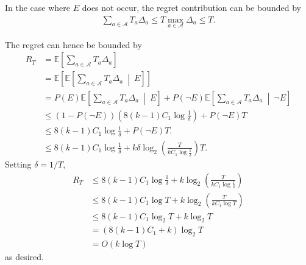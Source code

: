 In the case where $E$ does not occur, the regret contribution can be bounded by
\begin{equation}
    \begin{aligned}
        \sum_{a \in \mathcal{A}} T_a \Delta_a \leq T \max_{a\in \mathcal{A}} \Delta_a \leq T.
    \end{aligned}
\end{equation}

The regret can hence be bounded by
\begin{equation}
    \begin{aligned}
        R_T
         & =
        \mathbb{E}\left[ \sum_{a \in \mathcal{A}} T_a \Delta_a \right]
        \\
         & =
        \mathbb{E}\left[ \mathbb{E}\left[ \sum_{a \in \mathcal{A}} T_a \Delta_a \ \middle| \ E \right] \right]
        \\
         & = P(E) \mathbb{E}\left[ \sum_{a \in \mathcal{A}} T_a \Delta_a \ \middle| \ E \right] + P(\neg E) \mathbb{E}\left[ \sum_{a \in \mathcal{A}} T_a \Delta_a \ \middle| \ \neg E \right]
        \\
         & \leq
        (1 - P(\neg E)) \left( 8(k-1)C_1 \log \frac1\delta \right)
        + P(\neg E) T
        \\
         & \leq
        8(k-1)C_1 \log \frac1\delta + P(\neg E) T.
        \\
         & \leq
        8(k-1)C_1 \log \frac1\delta + k\delta \log_2 \left(\frac{T}{kC_1 \log \frac1\delta}\right) T.
    \end{aligned}
\end{equation}
Setting $\delta = 1/T$,
\begin{equation}
    \begin{aligned}
        R_T
         & \leq
        8(k-1)C_1 \log \frac1\delta + k \log_2 \left(\frac{T}{kC_1 \log \frac1\delta}\right)
        \\
         & \leq
        8(k-1)C_1 \log T + k \log_2 \left(\frac{T}{kC_1 \log T}\right)
        \\
         & \leq
        8(k-1)C_1 \log_2 T + k \log_2 T
        \\
         & =
        (8(k-1)C_1 + k) \log_2 T
        \\
         & =
        O(k \log T)
    \end{aligned}
\end{equation}
as desired.